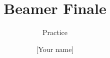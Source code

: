 \documentclass{beamer}
\title{Beamer Finale}
\subtitle{Practice}
\author{[Your name]}
\institute{Mahidol University, International College}
\begin{document}
\begin{frame}
\titlepage
\end{frame}
\end{document}
